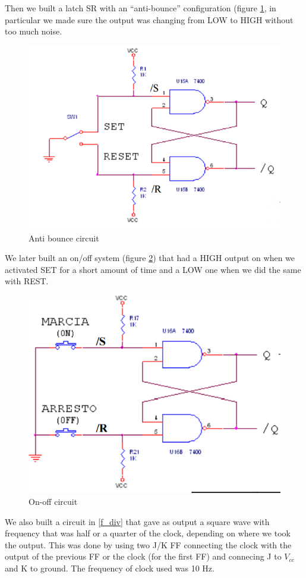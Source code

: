 Then we  built a latch SR with an ``anti-bounce'' configuration (figure \ref{bounce}, in particular we made sure the output was changing from LOW to HIGH without too much noise.
\begin{figure}[H]
\centering
\includegraphics[width=.7\textwidth]{11/bounce.png}
\caption{Anti bounce circuit}\label{bounce}

\end{figure}
We later built an on/off system (figure \ref{ON_OFF}) that had a HIGH output on when we activated SET for a short amount of time and a LOW one when we did the same with REST.
\begin{figure}[H]
\centering
\includegraphics[width=.7\textwidth]{11/ON_OFF.png}
\caption{On-off circuit}\label{ON_OFF}

\end{figure}
We also built a circuit in \ref{f_div} that gave as output a square wave with frequency that was half or a quarter of the clock, depending on where we took the output. This was done by using two J/K FF connecting the clock with the output of the previous  FF or the clock (for the first FF) and connecing J to $V_{cc}$ and K to ground. The frequency of clock used was 10 Hz.
